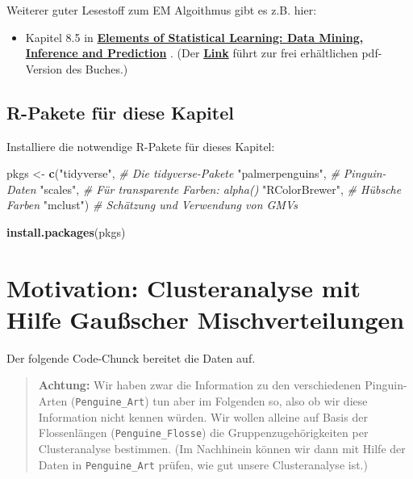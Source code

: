 \documentclass[
  ngerman,
]{book}
\newenvironment{Shaded}{\begin{snugshade}}{\end{snugshade}}
\newcommand{\CommentTok}[1]{\textcolor[rgb]{0.56,0.35,0.01}{\textit{#1}}}
\newcommand{\KeywordTok}[1]{\textcolor[rgb]{0.13,0.29,0.53}{\textbf{#1}}}
\newcommand{\NormalTok}[1]{#1}
\newcommand{\StringTok}[1]{\textcolor[rgb]{0.31,0.60,0.02}{#1}}
\providecommand{\tightlist}{%
  \setlength{\itemsep}{0pt}\setlength{\parskip}{0pt}}
\begin{document}
Weiterer guter Lesestoff zum EM Algoithmus gibt es z.B. hier:

\begin{itemize}
\tightlist
\item
  Kapitel 8.5 in \href{https://web.stanford.edu/~hastie/ElemStatLearn/}{\textbf{Elements of Statistical Learning: Data Mining, Inference and Prediction}} \citep{Elements}.
  (Der \href{https://web.stanford.edu/~hastie/ElemStatLearn/}{\textbf{Link}} führt zur frei erhältlichen pdf-Version des Buches.)
\end{itemize}

\hypertarget{r-pakete-fuxfcr-diese-kapitel}{%
\subsection*{R-Pakete für diese Kapitel}\label{r-pakete-fuxfcr-diese-kapitel}}

Installiere die notwendige R-Pakete für dieses Kapitel:

\begin{Shaded}
\begin{Highlighting}[]
\NormalTok{pkgs <-}\StringTok{ }\KeywordTok{c}\NormalTok{(}\StringTok{"tidyverse"}\NormalTok{,      }\CommentTok{# Die tidyverse-Pakete}
          \StringTok{"palmerpenguins"}\NormalTok{, }\CommentTok{# Pinguin-Daten}
          \StringTok{"scales"}\NormalTok{,         }\CommentTok{# Für transparente Farben: alpha()}
          \StringTok{"RColorBrewer"}\NormalTok{,   }\CommentTok{# Hübsche Farben}
          \StringTok{"mclust"}\NormalTok{)         }\CommentTok{# Schätzung und Verwendung von GMVs}

\KeywordTok{install.packages}\NormalTok{(pkgs)}
\end{Highlighting}
\end{Shaded}

\hypertarget{motivation-clusteranalyse-mit-hilfe-gauuxdfscher-mischverteilungen}{%
\section{Motivation: Clusteranalyse mit Hilfe Gaußscher Mischverteilungen}\label{motivation-clusteranalyse-mit-hilfe-gauuxdfscher-mischverteilungen}}

Der folgende Code-Chunck bereitet die Daten auf.

\begin{quote}
\textbf{Achtung:} Wir haben zwar die Information zu den verschiedenen Pinguin-Arten (\texttt{Penguine\_Art}) tun aber im Folgenden so, also ob wir diese Information nicht kennen würden. Wir wollen alleine auf Basis der Flossenlängen (\texttt{Penguine\_Flosse}) die Gruppenzugehörigkeiten per Clusteranalyse bestimmen. (Im Nachhinein können wir dann mit Hilfe der Daten in \texttt{Penguine\_Art} prüfen, wie gut unsere Clusteranalyse ist.)
\end{quote}
\end{document}
